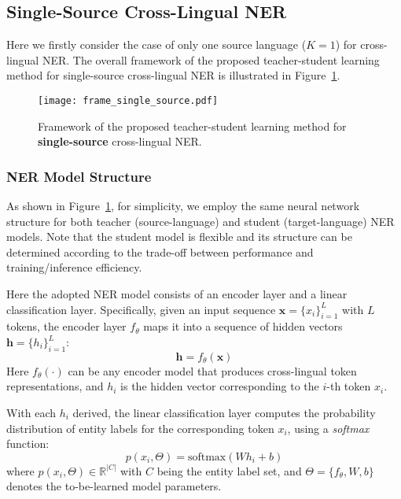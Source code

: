 \documentclass[11pt,a4paper]{article}
\begin{document}
	\subsection{Single-Source Cross-Lingual NER}
	Here we firstly consider the case of only one source language ($K=1$) for cross-lingual NER. The overall framework of the proposed teacher-student learning method for single-source cross-lingual NER is illustrated in Figure~\ref{fig:frame_single_source}. 
	
	\begin{figure}[t]
		\centering
		\texttt{[image: frame\_single\_source.pdf]}
		\caption{Framework of the proposed teacher-student learning method for \textbf{single-source} cross-lingual NER.}
		\label{fig:frame_single_source}
	\end{figure}
	
	\subsubsection{NER Model Structure}
	\label{sec:ner_model}
	As shown in Figure~\ref{fig:frame_single_source}, for simplicity, we employ the same neural network structure for both teacher (source-language) and student (target-language) NER models.
	Note that the student model is flexible and its structure can be determined according to the trade-off between performance and training/inference efficiency. 


	Here the adopted NER model consists of an encoder layer and a linear classification layer. Specifically, given an input sequence $\bm{x}=\{x_i\}_{i=1}^L$ with $L$ tokens, the encoder layer $f_{\theta}$ maps it into a sequence of hidden vectors $\bm{h}=\{h_i\}_{i=1}^L$:
	\begin{equation}
	\label{equ:h_single}
	\bm{h} = f_{\theta}(\bm{x})
	\end{equation}
	Here $f_{\theta}(\cdot)$ can be any encoder model that produces cross-lingual token representations, and $h_i$ is the hidden vector corresponding to the $i$-th token $x_i$.
	
	With each $h_i$ derived, the linear classification layer computes the probability distribution of entity labels for the corresponding token $x_i$, using a \textit{softmax} function:
	\begin{equation}
	\label{equ:p_single}
p(x_i, \Theta) = \text{softmax}(Wh_i+b)
	\end{equation}
	where $p(x_i, \Theta)\in \mathbb{R}^{|C|}$ with $C$ being the entity label set, and $\Theta=\{f_{\theta}, W, b\}$ denotes the to-be-learned model parameters.
	
\end{document}
